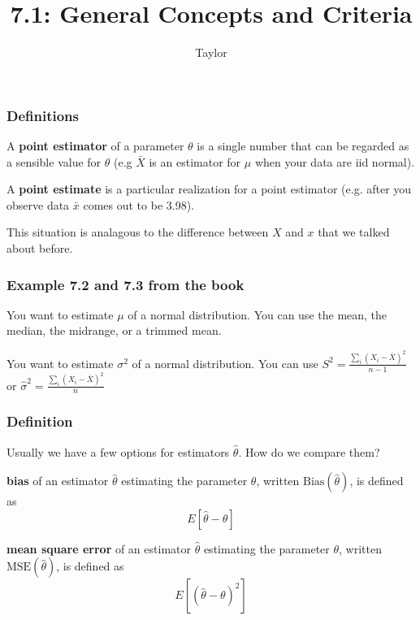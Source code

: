 \documentclass{beamer}
\title["7.1"]{7.1: General Concepts and Criteria}
\author{Taylor}
\institute[UVA] 
{
University of Virginia \\
\medskip
\textit{} 
}
\date{}
\begin{document}

\begin{frame}
\titlepage 
\end{frame}

\begin{frame}
\frametitle{Definitions}

A \textbf{point estimator} of a parameter $\theta$ is a single number that can be regarded as a sensible value for $\theta$ (e.g $\bar{X}$ is an estimator for $\mu$ when your data are iid normal). 
\newline

A \textbf{point estimate} is a particular realization for a point estimator (e.g. after you observe data $\bar{x}$ comes out to be 3.98).
\newline

This situation is analagous to the difference between $X$ and $x$ that we talked about before. 

\end{frame}

\begin{frame}
\frametitle{Example 7.2 and 7.3 from the book}

You want to estimate $\mu$ of a normal distribution. You can use the mean, the median, the midrange, or a trimmed mean. 
\newline

You want to estimate $\sigma^2$ of a normal distribution. You can use $S^2 = \frac{\sum_i(X_i - \bar{X})^2}{n-1}$ or $\hat{\sigma}^2 = \frac{\sum_i(X_i - \bar{X})^2}{n}$
\end{frame}

\begin{frame}
\frametitle{Definition}

Usually we have a few options for estimators $\hat{\theta}$. How do we compare them?
\newline

\textbf{bias} of an estimator $\hat{\theta}$ estimating the parameter $\theta$, written $\text{Bias}(\hat{\theta})$, is defined as 
\[
E\left[ \hat{\theta} - \theta  \right]
\]

\textbf{mean square error} of an estimator $\hat{\theta}$ estimating the parameter $\theta$, written $\text{MSE}(\hat{\theta})$, is defined as
\[
E\left[(\hat{\theta} - \theta )^2 \right]
\]

\end{frame}
\end{document}
